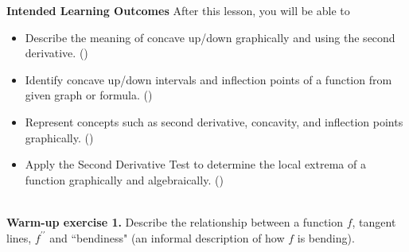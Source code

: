 \documentclass[10pt]{article}
\begin{document}
\pagestyle{otherpages}
\thispagestyle{firstpage}

\textbf{Intended Learning Outcomes}
After this lesson, you will be able to 

\begin{itemize}
    \item Describe the meaning of concave up/down graphically and using the second derivative. ()
    \item Identify concave up/down intervals and inflection points of a function from given graph or formula. ()
    \item Represent concepts such as second derivative, concavity, and inflection points graphically. ()
    \item Apply the Second Derivative Test to determine the local extrema of a function graphically and algebraically. ()
\end{itemize}

\vspace{-0.5cm}

\hrulefill\\


{\bf\color{blue} Warm-up exercise 1.} Describe the relationship between a function $f$, tangent lines, $f^{\prime\prime}$ and ``bendiness" (an informal description of how $f$ is bending).\\
\end{document}
